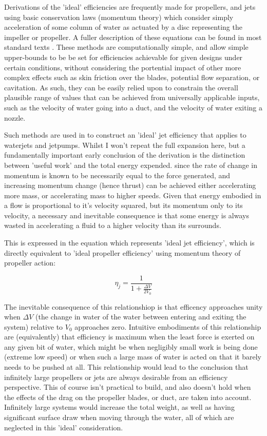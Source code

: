 \documentclass{article}\usepackage[]{graphicx}\usepackage[]{color}
\begin{document}
Derivations of the 'ideal' efficiencies are frequently made for propellers, and jets using basic conservation laws (momentum theory) which consider simply acceleration of some column of water as actuated by a disc representing the impeller or propeller.  A fuller description of these equations can be found in  most standard texts \parencite[131]{lewis1988}. These methods are computationally simple, and allow simple upper-bounds to be be set for efficiencies achievable for given designs under certain conditions, without considering the portential impact of other more complex effects such as skin friction over the blades, potential flow separation, or cavitation.  As such, they can be easily relied upon to constrain the overall plausible range of values that can be achieved from universally applicable inputs, such as the velocity of water going into a duct, and the velocity of water exiting a nozzle.

Such methods are used in \cite[8-14]{wislicenus1973} to construct an 'ideal' jet efficiency that applies to waterjets and jetpumps. Whilst I won't repeat the full expansion here, but a fundamentally important early conclusion of the derivation is the distinction between 'useful work' and the total energy expended. since the rate of change in momentum is known to be necessarily equal to the force generated, and increasing momentum change (hence thrust) can be achieved either accelerating more mass, or accelerating mass to higher speeds.   Given that energy embodied in a flow is proportional to it's velocity squared, but its momentum only to its velocity, a necessary and inevitable consequence is that some energy is always wasted in accelerating a fluid to a higher velocity than its surrounds.

This is expressed in the equation which represents 'ideal jet efficiency', which is directly equivalent to 'ideal propeller efficiency' using momentum theory of propeller action:

\begin{equation}
\label{eq:3}
\eta_j = \frac{1}{1+\frac{\Delta V}{2V_0}}
\end{equation}

The inevitable consequence of this relationshiop is that efficency approaches unity when $\Delta V$ (the change in water of the water between entering and exiting the system) relative to $V_0$ approaches zero.  Intuitive embodiments of this relationship are (equivalently) that efficiency is maximum when the least force is exerted on any given bit of water, which might be when negligibly small work is being done (extreme low speed) or when such a large mass of water is acted on that it barely needs to be pushed at all.  This relationship would lead to the conclusion that infinitely large propellers or jets are always desirable from an efficiency perspective.  This of course isn't practical to build, and also doesn't hold when the effects of the drag on the propeller blades, or duct, are taken into account.  Infinitely large systems would increase the total weight, as well as having significant surface draw when moving through the water, all of which are neglected in this 'ideal' consideration.
\end{document}
